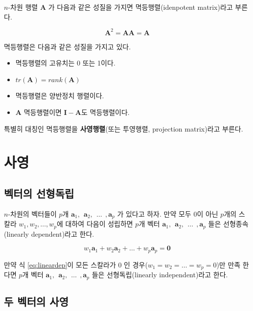 \documentclass[
  10pt,
]{book}
\providecommand{\tightlist}{%
  \setlength{\itemsep}{0pt}\setlength{\parskip}{0pt}}
\theoremstyle{definition}
\theoremstyle{definition}
\theoremstyle{definition}
\theoremstyle{definition}
\theoremstyle{remark}
\begin{document}
\(n\)-차원 행렬 \(\bm A\) 가 다음과 같은 성질을 가지면 멱등행렬(idenpotent matrix)라고 부른다.

\[ \bm A^2 = \bm A \bm A = \bm A \]

멱등행렬은 다음과 같은 성질을 가지고 있다.

\begin{itemize}
\tightlist
\item
  멱등행렬의 고유치는 0 또는 1이다.
\item
  \(tr(\bm A) =rank(\bm A)\)
\item
  멱등행렬은 양반정치 행렬이다.
\item
  \(\bm A\) 멱등행렬이면 \(\bm I - \bm A\)도 멱등행렬이다.
\end{itemize}

특별히 대칭인 멱등행렬을 \textbf{사영행렬}(또는 투영행렬, projection matrix)라고 부른다.

\hypertarget{uxc0acuxc601}{%
\section{사영}\label{uxc0acuxc601}}

\hypertarget{uxbca1uxd130uxc758-uxc120uxd615uxb3c5uxb9bd}{%
\subsection{벡터의 선형독립}\label{uxbca1uxd130uxc758-uxc120uxd615uxb3c5uxb9bd}}

\(n\)-차원의 벡터들이 \(p\)개 \(\bm a_1, ~~ \bm a_2, ~~\dots ~~, \bm a_p\) 가 있다고 하자.
만약 모두 \(0\)이 아닌 \(p\)개의 스칼라 \(w_1,w_2,\dots,w_p\)에 대하여 다음이 성립하면 \(p\)개 벡터 \(\bm a_1, ~~ \bm a_2, ~~\dots ~~, \bm a_p\) 들은 선형종속(linearly dependent)라고 한다.

\begin{equation}
w_1 \bm a_1 + w_2 \bm a_2 + \dots + w_p \bm a_p = \bm 0 
\label{eq:lineardep}
\end{equation}

만약 식 \eqref{eq:lineardep}이 모든 스칼라가 0 인 경우(\(w_1=w_2=\dots=w_p=0\))만 만족 한다면 \(p\)개 벡터 \(\bm a_1, ~~ \bm a_2, ~~\dots ~~, \bm a_p\) 들은 선형독립(linearly independent)라고 한다.

\hypertarget{uxb450-uxbca1uxd130uxc758-uxc0acuxc601}{%
\subsection{두 벡터의 사영}\label{uxb450-uxbca1uxd130uxc758-uxc0acuxc601}}
\end{document}
